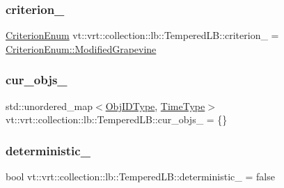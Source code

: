 \subsubsection{\texorpdfstring{criterion\+\_\+}{criterion\_}}
{\footnotesize\ttfamily \hyperlink{namespacevt_1_1vrt_1_1collection_1_1lb_a4e454750e102cf5404d5ac151148951c}{Criterion\+Enum} vt\+::vrt\+::collection\+::lb\+::\+Tempered\+L\+B\+::criterion\+\_\+ = \hyperlink{namespacevt_1_1vrt_1_1collection_1_1lb_a4e454750e102cf5404d5ac151148951caf2d66de88187d7c4c75884f5605ae168}{Criterion\+Enum\+::\+Modified\+Grapevine}\hspace{0.3cm}{\ttfamily [private]}}

\mbox{\label{structvt_1_1vrt_1_1collection_1_1lb_1_1_tempered_l_b_a77a4746596cd288e0833a95b2e47a8ef}} 
\subsubsection{\texorpdfstring{cur\+\_\+objs\+\_\+}{cur\_objs\_}}
{\footnotesize\ttfamily std\+::unordered\+\_\+map$<$\hyperlink{structvt_1_1vrt_1_1collection_1_1lb_1_1_base_l_b_a790b22acf448880599724749cdc4e9b3}{Obj\+I\+D\+Type}, \hyperlink{namespacevt_a876a9d0cd5a952859c72de8a46881442}{Time\+Type}$>$ vt\+::vrt\+::collection\+::lb\+::\+Tempered\+L\+B\+::cur\+\_\+objs\+\_\+ = \{\}\hspace{0.3cm}{\ttfamily [private]}}

\mbox{\label{structvt_1_1vrt_1_1collection_1_1lb_1_1_tempered_l_b_af99c4265a75445513e2aff865d65ba9e}} 
\subsubsection{\texorpdfstring{deterministic\+\_\+}{deterministic\_}}
{\footnotesize\ttfamily bool vt\+::vrt\+::collection\+::lb\+::\+Tempered\+L\+B\+::deterministic\+\_\+ = false\hspace{0.3cm}{\ttfamily [private]}}



